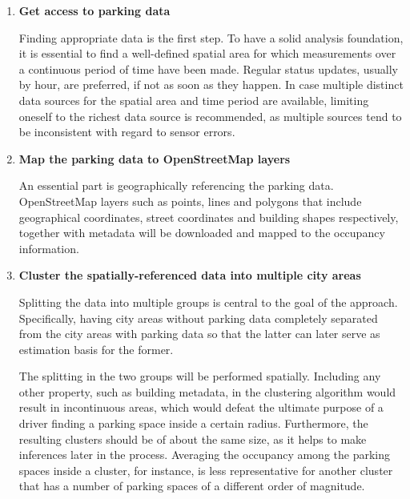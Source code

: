 \documentclass{ws-ijait}
\begin{document}
	\begin{enumerate}[label=\Roman*]
		
		\item{\textbf{Get access to parking data}}
		
		Finding appropriate data is the first step. To have a solid analysis foundation, it is essential to find a well-defined spatial area for which measurements over a continuous period of time have been made. Regular status updates, usually by hour, are preferred, if not as soon as they happen. In case multiple distinct data sources for the spatial area and time period are available, limiting oneself to the richest data source is recommended, as multiple sources tend to be inconsistent with regard to sensor errors.
		
		
		\item{\textbf{Map the parking data to OpenStreetMap layers}}
		
		An essential part is geographically referencing the parking data. OpenStreetMap layers such as points, lines and polygons that include geographical coordinates, street coordinates and building shapes respectively, together with metadata will be downloaded and mapped to the occupancy information.
		
		\item{\textbf{Cluster the spatially-referenced data into multiple city areas}}
		
		Splitting the data into multiple groups is central to the goal of the approach. Specifically, having city areas without parking data completely separated from the city areas with parking data so that the latter can later serve as estimation basis for the former. 
		
		The splitting in the two groups will be performed spatially. Including any other property, such as building metadata, in the clustering algorithm would result in incontinuous areas, which would defeat the ultimate purpose of a driver finding a parking space inside a certain radius. Furthermore, the resulting clusters should be of about the same size, as it helps to make inferences later in the process. Averaging the occupancy among the parking spaces inside a cluster, for instance, is less representative for another cluster that has a number of parking spaces of a different order of magnitude.		
		

\end{enumerate}
\end{document}
